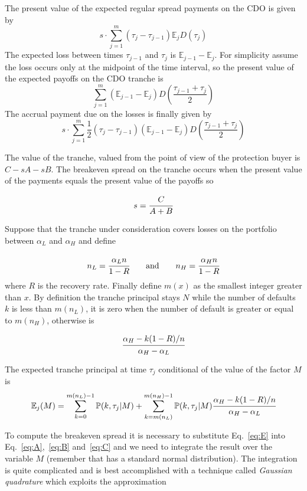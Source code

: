 The present value of the expected regular spread payments on the CDO is given by
\begin{equation}
s\cdot \sum_{j=1}^{m}(\tau_j - \tau_{j-1})\mathbb{E}_{j}D(\tau_j)
\label{eq:A}
\end{equation}
The expected loss between times $\tau_{j-1}$ and $\tau_j$ is $\mathbb{E}_{j-1}-\mathbb{E}_j$. For simplicity assume
the loss occurs only at the midpoint of the time interval, so the present value of the expected payoffs on the CDO tranche is
\begin{equation}
\sum_{j=1}^{m}(\mathbb{E}_{j-1}-\mathbb{E}_j)D\left(\frac{\tau_{j-1}+\tau_j}{2}\right)
\label{eq:C}
\end{equation}
The accrual payment due on the losses is finally given by
\begin{equation}
s\cdot\sum_{j=1}^{m}\frac{1}{2}(\tau_j - \tau_{j-1})(\mathbb{E}_{j-1}-\mathbb{E}_j)D(\frac{\tau_{j-1}+\tau_j}{2})
\label{eq:B}
\end{equation}

The value of the tranche, valued from the point of view of the protection buyer is $C-sA-sB$. The breakeven spread 
on the tranche occurs when the present value of the payments equals the present value of the payoffs so

\[ s = \cfrac{C}{A+B}\]

Suppose that the tranche under consideration covers losses on the portfolio between $\alpha_L$ and $\alpha_H$ and
define

\[n_L = \cfrac{\alpha_L n}{1-R}\qquad \mathrm{and}\qquad n_H = \cfrac{\alpha_H n}{1-R}\]
where $R$ is the recovery rate. Finally define $m(x)$ as the smallest integer greater than $x$.
By definition the tranche principal stays $N$ while the number of defaults $k$ is less than $m(n_L)$, it 
is zero when the number of default is greater or equal to $m(n_H)$, otherwise is

\[\cfrac{\alpha_H -k(1-R)/n}{\alpha_H - \alpha_L}\]

The expected tranche principal at time $\tau_j$ conditional of the value of the factor $M$ is
\begin{equation}
\mathbb{E}_j(M) = \sum_{k=0}^{m(n_L)-1}\mathbb{P}(k, \tau_j|M) + \sum_{k=m(n_L)}^{m(n_H)-1}\mathbb{P}(k, \tau_j|M) \cfrac{\alpha_H -k(1-R)/n}{\alpha_H - \alpha_L}
\label{eq:E}
\end{equation}

To compute the breakeven spread it is necessary to substitute Eq.~\ref{eq:E} into Eq.~\ref{eq:A},~\ref{eq:B} and~\ref{eq:C}
and we need to integrate the result over the variable $M$ (remember that has a standard normal distribution). 
The integration is quite complicated and is best accomplished with a technique called \emph{Gaussian quadrature} which
exploits the approximation

